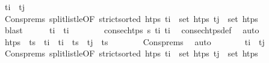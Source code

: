 \begin{isabellebody}
\ {\isachardoublequoteopen}t\isactrlsub i\ {\isacharless}{\kern0pt}\ t\isactrlsub j{\isachardoublequoteclose}\isanewline
\ \ \ \ \ \ \isamarkupfalse%
\ Cons{\isachardot}{\kern0pt}prems\ split{\isacharunderscore}{\kern0pt}list{}{\isacharunderscore}{\kern0pt}le{\isacharbrackleft}{\kern0pt}OF\ {\isacartoucheopen}strict{\isacharunderscore}{\kern0pt}sorted\ htps{\isacartoucheclose}\ {\isacartoucheopen}t\isactrlsub i\ {\isasymin}\ set\ htps{\isacartoucheclose}\ {\isacartoucheopen}t\isactrlsub j\ {\isasymin}\ set\ htps{\isacartoucheclose}{\isacharbrackright}{\kern0pt}\isanewline
\ \ \ \ \ \ \isamarkupfalse%
\ blast\isanewline
\ \ \ \ \isamarkupfalse%
\ {\isachardoublequoteopen}t\isactrlsub i\ {\isasymle}\ t\isactrlsub i{\isacharprime}{\kern0pt}{\isachardoublequoteclose}\isanewline
\ \ \ \ \ \ \isamarkupfalse%
\ {\isacartoucheopen}consec{\isacharunderscore}{\kern0pt}htps\ {\isasympi}s\ t\isactrlsub i\ t\isactrlsub i{\isacharprime}{\kern0pt}{\isacartoucheclose}\ \isamarkupfalse%
\ consec{\isacharunderscore}{\kern0pt}htps{\isacharunderscore}{\kern0pt}def\ \isamarkupfalse%
\ auto\isanewline
\ \ \ \ \isamarkupfalse%
\ {\isachardoublequoteopen}htps\ {\isacharequal}{\kern0pt}\ {\isacharparenleft}{\kern0pt}ts\ {\isacharat}{\kern0pt}\ {\isacharbrackleft}{\kern0pt}t\isactrlsub i{\isacharbrackright}{\kern0pt}{\isacharparenright}{\kern0pt}\ {\isacharat}{\kern0pt}\ t\isactrlsub i{\isacharprime}{\kern0pt}\ {\isacharhash}{\kern0pt}\ ts\ {\isacharat}{\kern0pt}\ t\isactrlsub j\ {\isacharhash}{\kern0pt}\ ts\isanewline
\ \ \ \ \ \ \isamarkupfalse%
\ Cons{\isachardot}{\kern0pt}prems\ \isamarkupfalse%
\ auto\isanewline
\ \ \ \ \isamarkupfalse%
\ \isamarkupfalse%
\ {\isachardoublequoteopen}t\isactrlsub i{\isacharprime}{\kern0pt}\ {\isasymle}\ t\isactrlsub j{\isachardoublequoteclose}\isanewline
\ \ \ \ \ \ \isamarkupfalse%
\ Cons{\isachardot}{\kern0pt}prems\ split{\isacharunderscore}{\kern0pt}list{}{\isacharunderscore}{\kern0pt}le{\isacharbrackleft}{\kern0pt}OF\ {\isacartoucheopen}strict{\isacharunderscore}{\kern0pt}sorted\ htps{\isacartoucheclose}\ {\isacartoucheopen}t\isactrlsub i{\isacharprime}{\kern0pt}\ {\isasymin}\ set\ htps{\isacartoucheclose}\ {\isacartoucheopen}t\isactrlsub j\ {\isasymin}\ set\ htps{\isacartoucheclose}{\isacharbrackright}{\kern0pt}\isanewline

\end{isabellebody}

